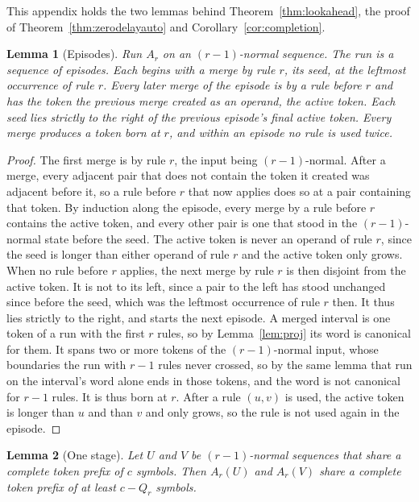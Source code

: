 \documentclass[11pt,a4paper]{article}
\theoremstyle{definition}
\theoremstyle{plain}
\newtheorem{lemma}{Lemma}
\begin{document}
This appendix holds the two lemmas behind Theorem~\ref{thm:lookahead}, the proof of Theorem~\ref{thm:zerodelayauto} and
Corollary~\ref{cor:completion}.

\begin{lemma}[Episodes]\label{lem:episodes}
Run \(A_r\) on an \((r-1)\)-normal sequence. The run is a sequence of episodes. Each begins with a merge by rule \(r\),
its seed, at the leftmost occurrence of rule \(r\). Every later merge of the episode is by a rule before \(r\) and has
the token the previous merge created as an operand, the active token. Each seed lies strictly to the right of the
previous episode's final active token. Every merge produces a token born at \(r\), and within an episode no rule is used
twice.
\end{lemma}

\begin{proof}
The first merge is by rule \(r\), the input being \((r-1)\)-normal. After a merge, every adjacent pair that does not
contain the token it created was adjacent before it, so a rule before \(r\) that now applies does so at a pair
containing that token. By induction along the episode, every merge by a rule before \(r\) contains the active token, and
every other pair is one that stood in the \((r-1)\)-normal state before the seed. The active token is never an operand
of rule \(r\), since the seed is longer than either operand of rule \(r\) and the active token only grows. When no rule
before \(r\) applies, the next merge by rule \(r\) is then disjoint from the active token. It is not to its left, since
a pair to the left has stood unchanged since before the seed, which was the leftmost occurrence of rule \(r\) then. It
thus lies strictly to the right, and starts the next episode. A merged interval is one token of a run with the first
\(r\) rules, so by Lemma~\ref{lem:proj} its word is canonical for them. It spans two or more tokens of the
\((r-1)\)-normal input, whose boundaries the run with \(r - 1\) rules never crossed, so by the same lemma that run on
the interval's word alone ends in those tokens, and the word is not canonical for \(r - 1\) rules. It is thus born at
\(r\). After a rule \((u, v)\) is used, the active token is longer than \(u\) and than \(v\) and only grows, so the rule
is not used again in the episode.
\end{proof}

\begin{lemma}[One stage]\label{lem:onestage}
Let \(U\) and \(V\) be \((r-1)\)-normal sequences that share a complete token prefix of \(c\) symbols. Then \(A_r(U)\)
and \(A_r(V)\) share a complete token prefix of at least \(c - Q_r\) symbols.
\end{lemma}
\end{document}
